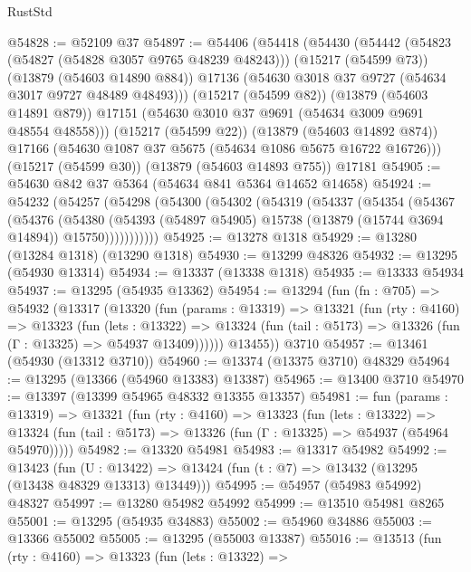 \begin{lexlean}{RustStd}
\begin{coremodule}
@54828 := @52109 @37
@54897 := @54406
    (@54418
      (@54430
        (@54442
          (@54823 (@54827 (@54828 @3057 @9765 @48239 @48243)))
          (@15217 (@54599 @73))
          (@13879 (@54603 @14890 @884))
          @17136
          (@54630 @3018 @37 @9727 (@54634 @3017 @9727 @48489 @48493)))
        (@15217 (@54599 @82))
        (@13879 (@54603 @14891 @879))
        @17151
        (@54630 @3010 @37 @9691 (@54634 @3009 @9691 @48554 @48558)))
      (@15217 (@54599 @22))
      (@13879 (@54603 @14892 @874))
      @17166
      (@54630 @1087 @37 @5675 (@54634 @1086 @5675 @16722 @16726)))
    (@15217 (@54599 @30))
    (@13879 (@54603 @14893 @755))
    @17181
@54905 := @54630 @842 @37 @5364 (@54634 @841 @5364 @14652 @14658)
@54924 := @54232
    (@54257
      (@54298
        (@54300
          (@54302
            (@54319
              (@54337
                (@54354
                  (@54367
                    (@54376
                      (@54380
                        (@54393
                          (@54897 @54905)
                          @15738
                          (@13879 (@15744 @3694 @14894))
                          @15750)))))))))))
@54925 := @13278 @1318
@54929 := @13280 (@13284 @1318) (@13290 @1318)
@54930 := @13299 @48326
@54932 := @13295 (@54930 @13314)
@54934 := @13337 (@13338 @1318)
@54935 := @13333 @54934
@54937 := @13295 (@54935 @13362)
@54954 := @13294
    (fun (fn : @705) =>
    @54932
      (@13317
        (@13320
          (fun (params : @13319) =>
          @13321
            (fun (rty : @4160) =>
            @13323
              (fun (lets : @13322) =>
              @13324 (fun (tail : @5173) => @13326 (fun (Γ : @13325) => @54937 @13409))))))
        @13455))
    @3710
@54957 := @13461 (@54930 (@13312 @3710))
@54960 := @13374 (@13375 @3710) @48329
@54964 := @13295 (@13366 (@54960 @13383) @13387)
@54965 := @13400 @3710
@54970 := @13397 (@13399 @54965 @48332 @13355 @13357)
@54981 := fun (params : @13319) =>
  @13321
    (fun (rty : @4160) =>
    @13323
      (fun (lets : @13322) =>
      @13324 (fun (tail : @5173) => @13326 (fun (Γ : @13325) => @54937 (@54964 @54970)))))
@54982 := @13320 @54981
@54983 := @13317 @54982
@54992 := @13423
    (fun (U : @13422) => @13424 (fun (t : @7) => @13432 (@13295 (@13438 @48329 @13313) @13449)))
@54995 := @54957 (@54983 @54992) @48327
@54997 := @13280 @54982 @54992
@54999 := @13510 @54981 @8265
@55001 := @13295 (@54935 @34883)
@55002 := @54960 @34886
@55003 := @13366 @55002
@55005 := @13295 (@55003 @13387)
@55016 := @13513
    (fun (rty : @4160) =>
    @13323
      (fun (lets : @13322) =>

\end{coremodule}
\end{lexlean}
